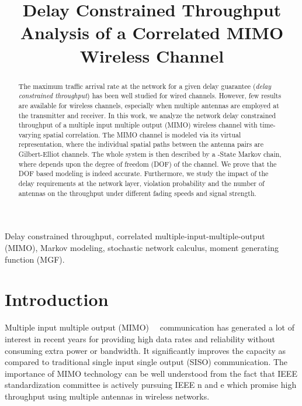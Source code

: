 \documentclass[10pt,conference]{IEEEtran}
\begin{document}
\title{Delay Constrained Throughput Analysis of a Correlated MIMO Wireless Channel}




\author{       

}




\maketitle




\begin{abstract}
The maximum traffic arrival rate at the network for a given delay guarantee (\emph{delay constrained throughput}) has been well studied for wired channels.
However, few results are available for wireless channels, especially when multiple antennas are employed at the transmitter and receiver.
In this work, we analyze the network delay constrained throughput of a multiple input multiple output (MIMO) wireless channel with time-varying spatial correlation.
The MIMO channel is modeled via its virtual representation, where the
individual spatial paths between the antenna pairs are Gilbert-Elliot channels.  The whole system is then described by a -State Markov chain, where  depends upon the degree of freedom (DOF) of the channel.
We prove that the DOF based modeling is indeed accurate.
Furthermore, we study the impact of the delay requirements at the network layer, violation probability and the number of antennas on the throughput under different fading speeds and signal strength.
\end{abstract}



\begin{IEEEkeywords}
Delay constrained throughput, correlated multiple-input-multiple-output (MIMO), Markov modeling, stochastic network calculus, moment generating function (MGF).
\end{IEEEkeywords}


\section{Introduction}
Multiple input multiple output (MIMO)~\cite{MIMO:Foschini:98:limits}~\cite{MIMO:Teletar99:CapacityOfMultiAntennaGaus} communication has generated a lot of interest in recent years for providing high data rates and reliability without consuming extra power or bandwidth. It significantly improves the capacity as compared to traditional single input single output (SISO) communication.
The importance of MIMO technology can be well understood from the fact that IEEE standardization committee is actively pursuing IEEE n and e which promise high throughput using multiple antennas in  wireless networks.
\end{document}
